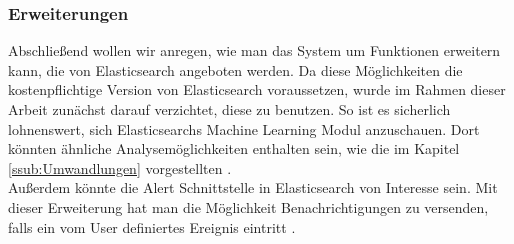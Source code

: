 \subsubsection{Erweiterungen}
\label{ssub:Erweiterungen}
Abschließend wollen wir anregen, wie man das System um Funktionen erweitern kann, die von Elasticsearch angeboten werden. Da diese Möglichkeiten die kostenpflichtige Version von Elasticsearch voraussetzen, wurde im Rahmen dieser Arbeit zunächst darauf verzichtet, diese zu benutzen. So ist es sicherlich lohnenswert, sich Elasticsearchs Machine Learning Modul anzuschauen. Dort könnten ähnliche Analysemöglichkeiten enthalten sein, wie die im Kapitel \ref{ssub:Umwandlungen} vorgestellten \citep{ElMl20}.\\
Außerdem könnte die Alert Schnittstelle in Elasticsearch von Interesse sein. Mit dieser Erweiterung hat man die Möglichkeit Benachrichtigungen zu versenden, falls ein vom User definiertes Ereignis eintritt \citep{ElAl20}.
